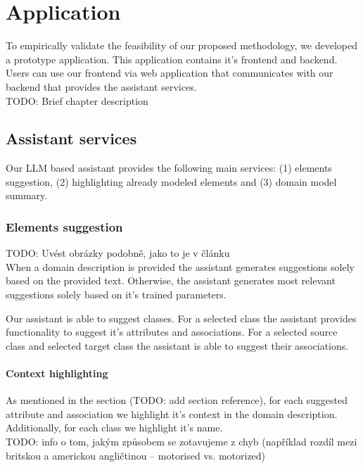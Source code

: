\chapter{Application}

To empirically validate the feasibility of our proposed methodology, we developed a prototype application. This application contains it's frontend and backend. Users can use our frontend via web application that communicates with our backend that provides the assistant services. \\

TODO: Brief chapter description \\

\section{Assistant services}

Our LLM based assistant provides the following main services: (1) elements suggestion, (2) highlighting already modeled elements and (3) domain model summary.

\subsection{Elements suggestion}

TODO: Uvést obrázky podobně, jako to je v článku \\

When a domain description is provided the assistant generates suggestions solely based on the provided text. Otherwise, the assistant generates most relevant suggestions solely based on it's trained parameters.

Our assistant is able to suggest classes. For a selected class the assistant provides functionality to suggest it's attributes and associations. For a selected source class and selected target class the assistant is able to suggest their associations.


\subsubsection{Context highlighting}

As mentioned in the section (TODO: add section reference), for each suggested attribute and association we highlight it's context in the domain description. Additionally, for each class we highlight it's name. \\

TODO: info o tom, jakým způsobem se zotavujeme z chyb (například rozdíl mezi britskou a americkou angličtinou -- motorised vs. motorized) \\



